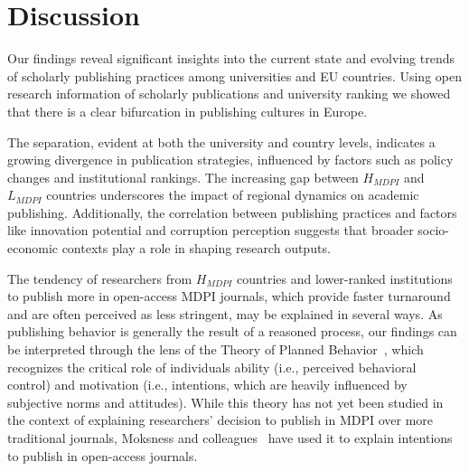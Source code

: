 \documentclass[amsfonts, amssymb, prl, superscriptaddress, notitlepage, twocolumn, nofootinbib]{revtex4-2}
\begin{document}
\section{Discussion}
Our findings reveal significant insights into the current state and evolving trends of scholarly publishing practices among universities and EU countries. Using open research information of scholarly publications and university ranking we showed that there is a clear bifurcation in publishing cultures in Europe. 

The separation, evident at both the university and country levels, indicates a growing divergence in publication strategies, influenced by factors such as policy changes and institutional rankings. The increasing gap between $H_{MDPI}$ and $L_{MDPI}$ countries underscores the impact of regional dynamics on academic publishing. Additionally, the correlation between publishing practices and factors like innovation potential and corruption perception suggests that broader socio-economic contexts play a role in shaping research outputs. 

The tendency of researchers from $H_{MDPI}$ countries and lower-ranked institutions to publish more in open-access MDPI journals, which provide faster turnaround and are often perceived as less stringent, may be explained in several ways. As publishing behavior is generally the result of a reasoned process, our findings can be interpreted through the lens of the Theory of Planned Behavior~\cite{ajzen1991}, which recognizes the critical role of individuals ability (i.e., perceived behavioral control) and motivation (i.e., intentions, which are heavily influenced by subjective norms and attitudes). While this theory has not yet been studied in the context of explaining researchers’ decision to publish in MDPI over more traditional journals, Moksness and colleagues~\cite{moksness2020} have used it to explain intentions to publish in open-access journals.
\end{document}
